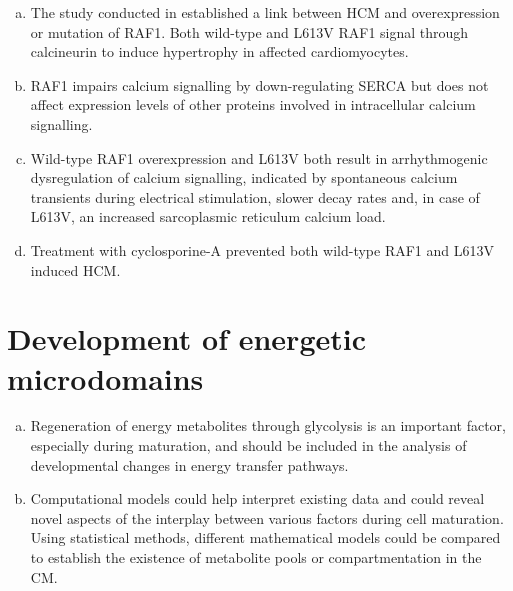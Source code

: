 \begin{enumerate}[a)]
    \setcounter{enumi}{\value{saveenum}}
    \item The study conducted in \PaperII established a link between
        \acf{HCM} and overexpression or mutation of \acl{RAF1}. Both
        wild-type  and L613V \ac{RAF1} signal through calcineurin to
        induce hypertrophy in affected cardiomyocytes.
    \item RAF1 impairs calcium signalling by down-regulating \ac{SERCA}
        but does not affect expression levels of other proteins involved
        in intracellular calcium signalling.

    \item Wild-type \ac{RAF1} overexpression and L613V both result in
        arrhythmogenic dysregulation of calcium signalling, indicated by spontaneous calcium 
transients during electrical stimulation, slower decay rates and, in case of L613V, an increased sarcoplasmic reticulum calcium load.
\item Treatment with cyclosporine-A  prevented both wild-type \ac{RAF1} and L613V induced \ac{HCM}.

  \setcounter{saveenum}{\value{enumi}}

\end{enumerate}

\section*{Development of energetic microdomains}
\begin{enumerate}[a)]
    \setcounter{enumi}{\value{saveenum}}
    \item Regeneration of energy metabolites through glycolysis is an
        important factor, especially during maturation, and should be
        included in the analysis of developmental changes in energy
        transfer pathways.
    \item Computational models could help interpret existing data and
        could reveal novel aspects of the interplay between various
        factors during cell maturation. Using statistical methods,
        different mathematical models could be compared to establish the
        existence of metabolite pools or compartmentation in the
        \ac{CM}.
\end{enumerate}



\endinput
